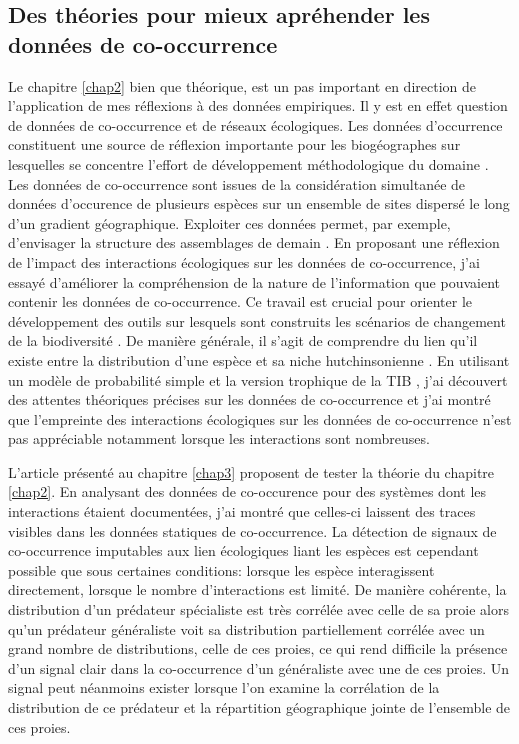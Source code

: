 \subsection*{Des théories pour mieux apréhender les données de
co-occurrence}\label{des-thuxe9ories-pour-mieux-apruxe9hender-les-donnuxe9es-de-co-occurrence}

Le chapitre \ref{chap2} bien que théorique, est un pas important en
direction de l'application de mes réflexions à des données empiriques.
Il y est en effet question de données de co-occurrence et de réseaux
écologiques. Les données d'occurrence constituent une source de
réflexion importante pour les biogéographes sur lesquelles se concentre
l'effort de développement méthodologique du domaine
\citep{Elith2006, Phillips2006, Pollock2014}. Les données de
co-occurrence sont issues de la considération simultanée de données
d'occurence de plusieurs espèces sur un ensemble de sites dispersé le
long d'un gradient géographique. Exploiter ces données permet, par
exemple, d'envisager la structure des assemblages de demain
\citep{Albouy2012}. En proposant une réflexion de l'impact des
interactions écologiques sur les données de co-occurrence, j'ai essayé
d'améliorer la compréhension de la nature de l'information que pouvaient
contenir les données de co-occurrence. Ce travail est crucial pour
orienter le développement des outils sur lesquels sont construits les
scénarios de changement de la biodiversité \citep{Godsoe2015}. De
manière générale, il s'agit de comprendre du lien qu'il existe entre la
distribution d'une espèce et sa niche hutchinsonienne
\citep{Pulliam2000, Godsoe2010a}. En utilisant un modèle de probabilité
simple et la version trophique de la TIB \citep{Gravel2011}, j'ai
découvert des attentes théoriques précises sur les données de
co-occurrence et j'ai montré que l'empreinte des interactions
écologiques sur les données de co-occurrence n'est pas appréciable
notamment lorsque les interactions sont nombreuses.

L'article présenté au chapitre \ref{chap3} proposent de tester la
théorie du chapitre \ref{chap2}. En analysant des données de
co-occurence pour des systèmes dont les interactions étaient
documentées, j'ai montré que celles-ci laissent des traces visibles dans
les données statiques de co-occurrence. La détection de signaux de
co-occurrence imputables aux lien écologiques liant les espèces est
cependant possible que sous certaines conditions: lorsque les espèce
interagissent directement, lorsque le nombre d'interactions est limité.
De manière cohérente, la distribution d'un prédateur spécialiste est
très corrélée avec celle de sa proie alors qu'un prédateur généraliste
voit sa distribution partiellement corrélée avec un grand nombre de
distributions, celle de ces proies, ce qui rend difficile la présence
d'un signal clair dans la co-occurrence d'un généraliste avec une de ces
proies. Un signal peut néanmoins exister lorsque l'on examine la
corrélation de la distribution de ce prédateur et la répartition
géographique jointe de l'ensemble de ces proies.

